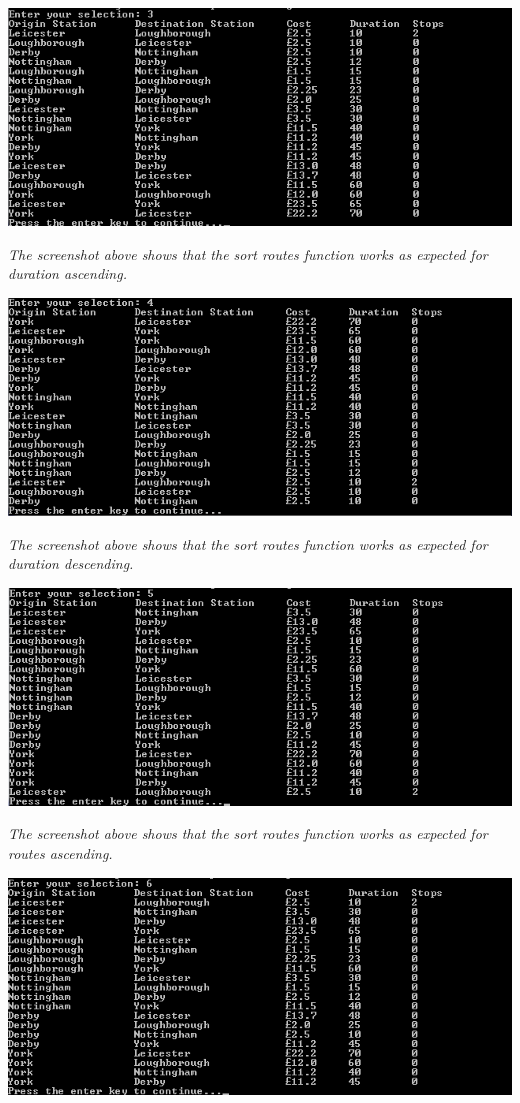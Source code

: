\documentclass[10pt, a4paper]{article}
\begin{document}
\includegraphics{Functionality9.png}

\textit{The screenshot above shows that the sort routes function works as expected for duration ascending.}

\includegraphics{Functionality10.png}

\textit{The screenshot above shows that the sort routes function works as expected for duration descending.}

\includegraphics{Functionality11.png}

\textit{The screenshot above shows that the sort routes function works as expected for routes ascending.}

\includegraphics{Functionality12.png}
\end{document}
